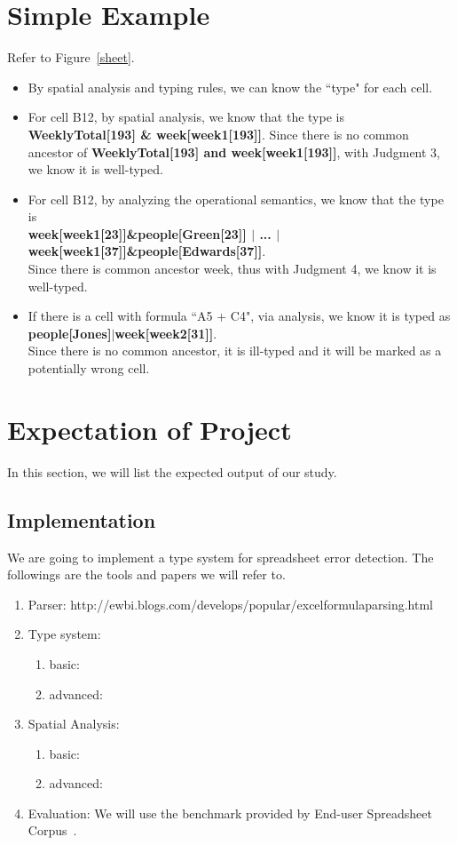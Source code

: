 \documentclass[a4paper]{article}
\begin{document}
\section{Simple Example}
Refer to Figure~\ref{sheet}.
\begin{itemize}
\item By spatial analysis and typing rules, we can know the ``type" for each cell. 
\item For cell B12, by spatial analysis, we know that the type is \textbf{WeeklyTotal[193] \& week[week1[193]]}. Since there is no common ancestor of \textbf{WeeklyTotal[193] and week[week1[193]]}, with Judgment 3, we know it is well-typed.
\item For cell B12, by analyzing the operational semantics, we know that the type is \\
\textbf{week[week1[23]]\&people[Green[23]] $|$ ... $|$ week[week1[37]]\&people[Edwards[37]]}. \\
Since there is common ancestor week, thus with Judgment 4, we know it is well-typed.
\item If there is a cell with formula ``A5 + C4", via analysis, we know it is typed as \textbf{people[Jones]$|$week[week2[31]]}.\\ 
Since there is no common ancestor, it is ill-typed and it will be marked as a potentially wrong cell.
\end{itemize}

\section{Expectation of Project}
In this section, we will list the expected output of our study.
\subsection{Implementation}
We are going to implement a type system for spreadsheet error detection. The followings are the tools and papers we will refer to.
\begin{enumerate}
\item Parser: http://ewbi.blogs.com/develops/popular/excelformulaparsing.html
\item Type system:
  \begin{enumerate}
	\item basic: \cite{abraham2006type}
    \item advanced: \cite{cunha2015embedding}
  \end{enumerate}
\item Spatial Analysis:
  \begin{enumerate}
	\item basic: \cite{abraham2004header}
    \item advanced: \cite{chambers2009automatic}
  \end{enumerate}
\item Evaluation: We will use the benchmark provided by End-user Spreadsheet Corpus~\cite{fisher2005euses}.
\end{enumerate}
\end{document}
